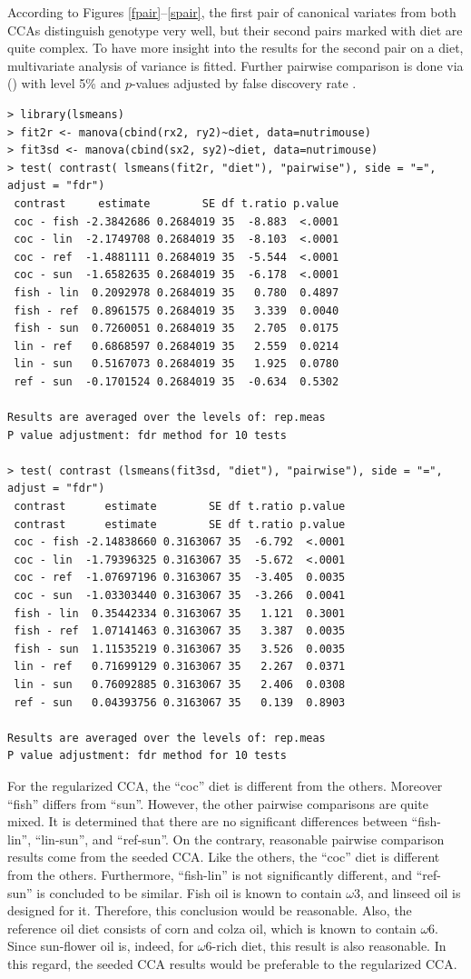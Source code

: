 According to Figures \ref{fpair}--\ref{spair},
the first pair of canonical variates from both CCAs
distinguish genotype very well,
but their second pairs marked with diet are quite complex.
To have more insight into the results for the second pair on a diet,
multivariate analysis of variance is fitted. 
Further pairwise comparison is done via  (\cite{lsmeans})
with level 5\% and $p$-values adjusted by false discovery rate \cite{fdr}.
%
\begin{verbatim}
> library(lsmeans)
> fit2r <- manova(cbind(rx2, ry2)~diet, data=nutrimouse)
> fit3sd <- manova(cbind(sx2, sy2)~diet, data=nutrimouse)
> test( contrast( lsmeans(fit2r, "diet"), "pairwise"), side = "=",  adjust = "fdr")
 contrast     estimate        SE df t.ratio p.value
 coc - fish -2.3842686 0.2684019 35  -8.883  <.0001
 coc - lin  -2.1749708 0.2684019 35  -8.103  <.0001
 coc - ref  -1.4881111 0.2684019 35  -5.544  <.0001
 coc - sun  -1.6582635 0.2684019 35  -6.178  <.0001
 fish - lin  0.2092978 0.2684019 35   0.780  0.4897
 fish - ref  0.8961575 0.2684019 35   3.339  0.0040
 fish - sun  0.7260051 0.2684019 35   2.705  0.0175
 lin - ref   0.6868597 0.2684019 35   2.559  0.0214
 lin - sun   0.5167073 0.2684019 35   1.925  0.0780
 ref - sun  -0.1701524 0.2684019 35  -0.634  0.5302

Results are averaged over the levels of: rep.meas
P value adjustment: fdr method for 10 tests

> test( contrast (lsmeans(fit3sd, "diet"), "pairwise"), side = "=",  adjust = "fdr")
 contrast      estimate        SE df t.ratio p.value
 contrast      estimate        SE df t.ratio p.value
 coc - fish -2.14838660 0.3163067 35  -6.792  <.0001
 coc - lin  -1.79396325 0.3163067 35  -5.672  <.0001
 coc - ref  -1.07697196 0.3163067 35  -3.405  0.0035
 coc - sun  -1.03303440 0.3163067 35  -3.266  0.0041
 fish - lin  0.35442334 0.3163067 35   1.121  0.3001
 fish - ref  1.07141463 0.3163067 35   3.387  0.0035
 fish - sun  1.11535219 0.3163067 35   3.526  0.0035
 lin - ref   0.71699129 0.3163067 35   2.267  0.0371
 lin - sun   0.76092885 0.3163067 35   2.406  0.0308
 ref - sun   0.04393756 0.3163067 35   0.139  0.8903

Results are averaged over the levels of: rep.meas
P value adjustment: fdr method for 10 tests
\end{verbatim}
%
For the regularized CCA, the ``coc'' diet is different from the others. 
Moreover ``fish'' differs from ``sun''.
However, the other pairwise comparisons are quite mixed.
It is determined that there are no significant differences between
``fish-lin'', ``lin-sun'', and ``ref-sun''.
On the contrary, reasonable pairwise comparison results come
from the seeded CCA.
Like the others, the ``coc'' diet is different from the others.
Furthermore, ``fish-lin'' is not significantly different, and
``ref-sun'' is concluded to be similar.
Fish oil is known to contain $\omega 3$, and linseed oil is designed for it.
Therefore, this conclusion would be reasonable.
Also, the reference oil diet consists of corn and colza oil,
which is known to contain $\omega 6$.
Since sun-flower oil is, indeed, for $\omega 6$-rich diet,
this result is also reasonable.
In this regard, the seeded CCA results would be preferable to the regularized CCA.

